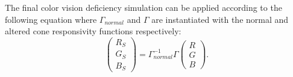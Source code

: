 \documentclass{sig-alternate-05-2015}
\begin{document}
The final color vision deficiency simulation can be applied according to the following equation where $\Gamma_{normal}$ and $\Gamma$ are  instantiated with the normal and altered cone responsivity functions respectively:
\begin{equation}
    \begin{pmatrix}
        R_S \\ G_S \\ B_S
    \end{pmatrix}
    =
    \Gamma_{normal}^{-1}
    \Gamma
    \begin{pmatrix}
        R \\ G \\ B
    \end{pmatrix}.
\end{equation}
\end{document}
